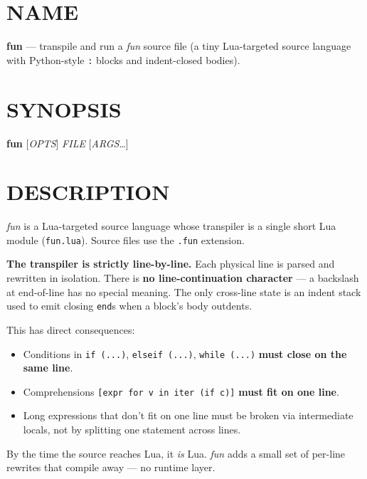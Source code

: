 \documentclass[10pt,twocolumn]{article}
\providecommand{\passthrough}[1]{#1}
\providecommand{\tightlist}{\setlength{\itemsep}{0pt}\setlength{\parskip}{0pt}}
\begin{document}
\section{NAME}\label{name}

\textbf{fun} --- transpile and run a \emph{fun} source file (a tiny
Lua-targeted source language with Python-style
\passthrough{\lstinline!:!} blocks and indent-closed bodies).

\section{SYNOPSIS}\label{synopsis}

\textbf{fun} {[}\emph{OPTS}{]} \emph{FILE} {[}\emph{ARGS}\ldots{]}

\section{DESCRIPTION}\label{description}

\emph{fun} is a Lua-targeted source language whose transpiler is a
single short Lua module (\passthrough{\lstinline!fun.lua!}). Source
files use the \passthrough{\lstinline!.fun!} extension.

\textbf{The transpiler is strictly line-by-line.} Each physical line is
parsed and rewritten in isolation. There is \textbf{no line-continuation
character} --- a backslash at end-of-line has no special meaning. The
only cross-line state is an indent stack used to emit closing
\passthrough{\lstinline!end!}s when a block's body outdents.

This has direct consequences:

\begin{itemize}
\tightlist
\item
  Conditions in \passthrough{\lstinline!if (...)!},
  \passthrough{\lstinline!elseif (...)!},
  \passthrough{\lstinline!while (...)!} \textbf{must close on the same
  line}.
\item
  Comprehensions \passthrough{\lstinline![expr for v in iter (if c)]!}
  \textbf{must fit on one line}.
\item
  Long expressions that don't fit on one line must be broken via
  intermediate locals, not by splitting one statement across lines.
\end{itemize}

By the time the source reaches Lua, it \emph{is} Lua. \emph{fun} adds a
small set of per-line rewrites that compile away --- no runtime layer.
\end{document}
